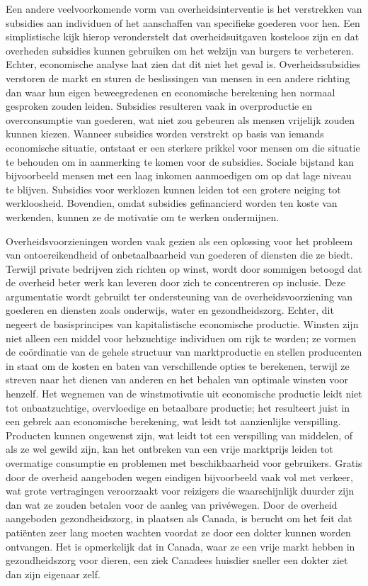 Een andere veelvoorkomende vorm van overheidsinterventie is het verstrekken van subsidies aan individuen of het aanschaffen van specifieke goederen voor hen. Een simplistische kijk hierop veronderstelt dat overheidsuitgaven kosteloos zijn en dat overheden subsidies kunnen gebruiken om het welzijn van burgers te verbeteren. Echter, economische analyse laat zien dat dit niet het geval is. Overheidssubsidies verstoren de markt en sturen de beslissingen van mensen in een andere richting dan waar hun eigen beweegredenen en economische berekening hen normaal gesproken zouden leiden. Subsidies resulteren vaak in overproductie en overconsumptie van goederen, wat niet zou gebeuren als mensen vrijelijk zouden kunnen kiezen. Wanneer subsidies worden verstrekt op basis van iemands economische situatie, ontstaat er een sterkere prikkel voor mensen om die situatie te behouden om in aanmerking te komen voor de subsidies. Sociale bijstand kan bijvoorbeeld mensen met een laag inkomen aanmoedigen om op dat lage niveau te blijven. Subsidies voor werklozen kunnen leiden tot een grotere neiging tot werkloosheid. Bovendien, omdat subsidies gefinancierd worden ten koste van werkenden, kunnen ze de motivatie om te werken ondermijnen.

Overheidsvoorzieningen worden vaak gezien als een oplossing voor het probleem van ontoereikendheid of onbetaalbaarheid van goederen of diensten die ze biedt. Terwijl private bedrijven zich richten op winst, wordt door sommigen betoogd dat de overheid beter werk kan leveren door zich te concentreren op inclusie. Deze argumentatie wordt gebruikt ter ondersteuning van de overheidsvoorziening van goederen en diensten zoals onderwijs, water en gezondheidszorg. Echter, dit negeert de basisprincipes van kapitalistische economische productie. Winsten zijn niet alleen een middel voor hebzuchtige individuen om rijk te worden; ze vormen de coördinatie van de gehele structuur van marktproductie en stellen producenten in staat om de kosten en baten van verschillende opties te berekenen, terwijl ze streven naar het dienen van anderen en het behalen van optimale winsten voor henzelf. Het wegnemen van de winstmotivatie uit economische productie leidt niet tot onbaatzuchtige, overvloedige en betaalbare productie; het resulteert juist in een gebrek aan economische berekening, wat leidt tot aanzienlijke verspilling. Producten kunnen ongewenst zijn, wat leidt tot een verspilling van middelen, of als ze wel gewild zijn, kan het ontbreken van een vrije marktprijs leiden tot overmatige consumptie en problemen met beschikbaarheid voor gebruikers. \textquotesingle Gratis\textquotesingle{} door de overheid aangeboden wegen eindigen bijvoorbeeld vaak vol met verkeer, wat grote vertragingen veroorzaakt voor reizigers die waarschijnlijk duurder zijn dan wat ze zouden betalen voor de aanleg van privéwegen. Door de overheid aangeboden gezondheidszorg, in plaatsen als Canada, is berucht om het feit dat patiënten zeer lang moeten wachten voordat ze door een dokter kunnen worden ontvangen. Het is opmerkelijk dat in Canada, waar ze een vrije markt hebben in gezondheidszorg voor dieren, een ziek Canadees huisdier sneller een dokter ziet dan zijn eigenaar zelf.\autocite{184}

